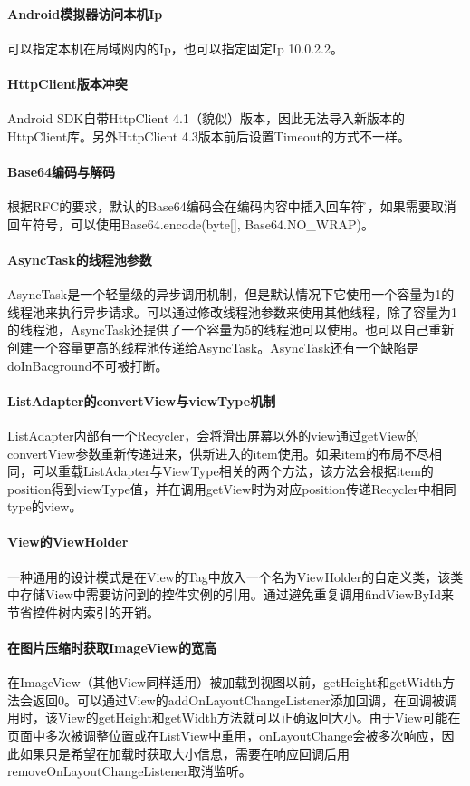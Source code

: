 \documentclass[UTF8]{ctexart}
\begin{document}
    \paragraph{Android模拟器访问本机Ip}
    可以指定本机在局域网内的Ip，也可以指定固定Ip 10.0.2.2。
    \paragraph{HttpClient版本冲突}
    Android SDK自带HttpClient 4.1（貌似）版本，因此无法导入新版本的HttpClient库。另外HttpClient 4.3版本前后设置Timeout的方式不一样。
    \paragraph{Base64编码与解码}
    根据RFC的要求，默认的Base64编码会在编码内容中插入回车符号\r\n，如果需要取消回车符号，可以使用Base64.encode(byte[], Base64.NO_WRAP)。
    \paragraph{AsyncTask的线程池参数}
    AsyncTask是一个轻量级的异步调用机制，但是默认情况下它使用一个容量为1的线程池来执行异步请求。可以通过修改线程池参数来使用其他线程，除了容量为1的线程池，AsyncTask还提供了一个容量为5的线程池可以使用。也可以自己重新创建一个容量更高的线程池传递给AsyncTask。AsyncTask还有一个缺陷是doInBacground不可被打断。
    \paragraph{ListAdapter的convertView与viewType机制}
    ListAdapter内部有一个Recycler，会将滑出屏幕以外的view通过getView的convertView参数重新传递进来，供新进入的item使用。如果item的布局不尽相同，可以重载ListAdapter与ViewType相关的两个方法，该方法会根据item的position得到viewType值，并在调用getView时为对应position传递Recycler中相同type的view。
    \paragraph{View的ViewHolder}
    一种通用的设计模式是在View的Tag中放入一个名为ViewHolder的自定义类，该类中存储View中需要访问到的控件实例的引用。通过避免重复调用findViewById来节省控件树内索引的开销。
    \paragraph{在图片压缩时获取ImageView的宽高}
    在ImageView（其他View同样适用）被加载到视图以前，getHeight和getWidth方法会返回0。可以通过View的addOnLayoutChangeListener添加回调，在回调被调用时，该View的getHeight和getWidth方法就可以正确返回大小。由于View可能在页面中多次被调整位置或在ListView中重用，onLayoutChange会被多次响应，因此如果只是希望在加载时获取大小信息，需要在响应回调后用removeOnLayoutChangeListener取消监听。
\end{document}
